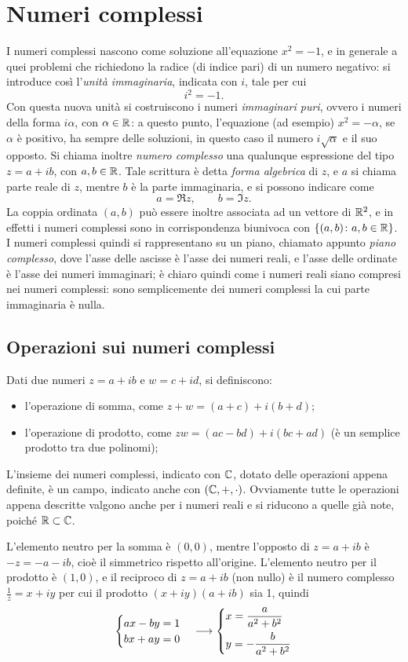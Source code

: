 \chapter{Numeri complessi}
I numeri complessi nascono come soluzione all'equazione $x^2=-1$, e in generale a quei problemi che richiedono la radice (di indice pari) di un numero negativo: si introduce così l'\emph{unità immaginaria}, indicata con $i$, tale per cui
\[
i^2=-1.
\]
Con questa nuova unità si costruiscono i numeri \emph{immaginari puri}, ovvero i numeri della forma $i\alpha$, con $\alpha\in\mathbb{R}$: a questo punto, l'equazione (ad esempio) $x^2=-\alpha$, se $\alpha$ è positivo, ha sempre delle soluzioni, in questo caso il numero $i\sqrt{\alpha}$ e il suo opposto.
Si chiama inoltre \emph{numero complesso} una qualunque espressione del tipo $z=a+ib$, con $a,b\in\mathbb{R}$. Tale scrittura è detta \emph{forma algebrica} di $z$, e $a$ si chiama parte reale di $z$, mentre $b$ è la parte immaginaria, e si possono indicare come
\[
a=\Re z,\qquad b=\Im z.
\]
La coppia ordinata $(a,b)$ può essere inoltre associata ad un vettore di $\mathbb{R}^2$, e in effetti i numeri complessi sono in corrispondenza biunivoca con $\{(a,b)\colon a,b\in\mathbb{R}\}$. I numeri complessi quindi si rappresentano su un piano, chiamato appunto \emph{piano complesso}, dove l'asse delle ascisse è l'asse dei numeri reali, e l'asse delle ordinate è l'asse dei numeri immaginari; è chiaro quindi come i numeri reali siano compresi nei numeri complessi: sono semplicemente dei numeri complessi la cui parte immaginaria è nulla.

\section{Operazioni sui numeri complessi}
Dati due numeri $z=a+ib$ e $w=c+id$, si definiscono:
\begin{itemize}
\item l'operazione di somma, come $z+w=(a+c)+i(b+d)$;
\item l'operazione di prodotto, come $zw=(ac-bd)+i(bc+ad)$ (è un semplice prodotto tra due polinomi);
\end{itemize}
L'insieme dei numeri complessi, indicato con $\mathbb{C}$, dotato delle operazioni appena definite, è un campo, indicato anche con $(\mathbb{C},+,\cdot)$.
Ovviamente tutte le operazioni appena descritte valgono anche per i numeri reali e si riducono a quelle già note, poiché $\mathbb{R}\subset\mathbb{C}$.

L'elemento neutro per la somma è $(0,0)$, mentre l'opposto di $z=a+ib$ è $-z=-a-ib$, cioè il simmetrico rispetto all'origine.
L'elemento neutro per il prodotto è $(1,0)$, e il reciproco di $z=a+ib$ (non nullo) è il numero complesso $\frac1{z}=x+iy$ per cui il prodotto $(x+iy)(a+ib)$ sia 1, quindi
\[
\begin{cases}
	ax-by=1\\
	bx+ay=0
\end{cases}
\longrightarrow
\begin{dcases}
	x=\frac{a}{a^2+b^2}\\
	y=-\frac{b}{a^2+b^2}
\end{dcases}
\]

